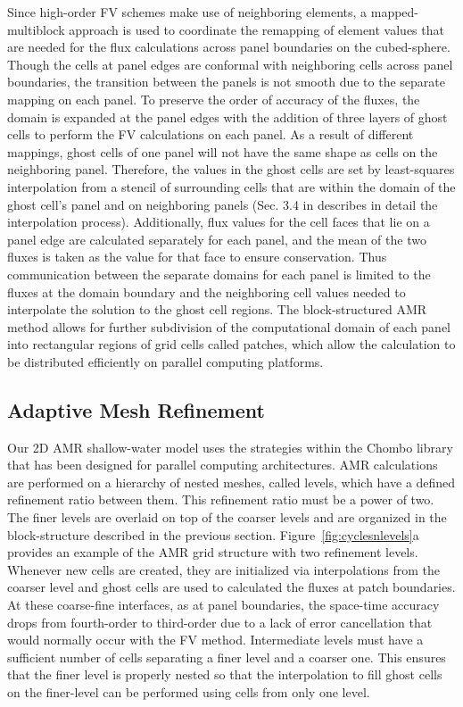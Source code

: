 Since high-order FV schemes make use of neighboring elements, 
a mapped-multiblock approach is used to coordinate the remapping of
element 
values that are needed for the flux calculations across panel boundaries on the
cubed-sphere.  Though the cells at panel edges are conformal with
neighboring cells across panel boundaries, the transition between the
panels is not smooth due to the separate mapping on each panel.  To
preserve the order of accuracy of the fluxes, the domain is expanded at
the panel edges with the addition of three layers of ghost cells to perform the FV
calculations on each panel.  As a result of different mappings, ghost
cells of one panel will not have the same shape as cells on the
neighboring panel.  Therefore, the values in the ghost cells are set by
least-squares interpolation from a stencil of surrounding cells that are
within the domain of the ghost cell's panel and on neighboring panels 
(Sec. 3.4 in \cite{mccorquodale2015adaptive}
 describes in detail the interpolation process).
Additionally, flux values for the cell faces that lie on a panel edge
are calculated separately for each panel, and the mean of the 
two fluxes is taken as the value  
for that face to ensure conservation. 
Thus communication between the separate domains
for each panel is limited to the fluxes at the domain boundary and the
neighboring cell values needed to interpolate the solution to the ghost
cell regions.  The block-structured AMR method allows for further
subdivision of the computational domain of each panel into rectangular
regions of grid cells called patches, which allow the calculation to be
distributed efficiently on parallel computing platforms.

\subsection{Adaptive Mesh Refinement}
\label{subsec:AMR}

Our 2D AMR shallow-water model
uses the strategies within the Chombo library \citep{Adams:2015gd} that
has been designed for parallel computing architectures.  AMR
calculations are performed on a hierarchy of nested meshes, called
levels, which have a defined refinement ratio between them. This refinement ratio must be a power of two. The finer
levels are overlaid on top of the coarser levels and are organized in
the block-structure described in the previous section.  
Figure~\ref{fig:cyclesnlevels}a provides an example of the AMR grid structure with two refinement levels.
Whenever new cells are created, they are initialized via interpolations from the coarser level and ghost cells
are used to calculated the fluxes at patch boundaries.  At these
coarse-fine interfaces, as at panel boundaries, the space-time accuracy
drops from fourth-order to third-order due to a lack of error
cancellation that would normally occur with the FV method.  Intermediate
levels must have a sufficient number of cells separating a finer level
and a coarser one. This ensures that the finer level is properly nested so that
the interpolation to fill ghost cells on the finer-level can be
performed using cells from only one level.

